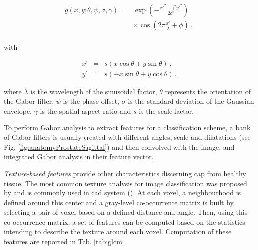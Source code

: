 \begin{enumerate}[leftmargin=*]
\begin{equation}
\begin{aligned}
	g(x,y;\theta,\psi,\sigma,\gamma) = & \exp \left( - \frac{x'^{2}+ \gamma^{2}y'^{2}}{2 \sigma^{2}} \right) \\
	& \times \cos \left( 2 \pi \frac{x'}{\lambda} + \phi \right) \ , \\
\end{aligned}
\end{equation}

\noindent with 

\begin{eqnarray}
	x' & = & s\left( x \cos \theta + y \sin \theta \right) \ , \nonumber \\
	y' & = & s \left( - x \sin \theta + y \cos \theta \right) \ . \nonumber
\end{eqnarray}

\noindent where $\lambda$ is the wavelength of the sinusoidal factor, $\theta$ represents the orientation of the Gabor filter, $\psi$ is the phase offset, $\sigma$ is the standard deviation of the Gaussian envelope, $\gamma$ is the spatial aspect ratio and $s$ is the scale factor.

To perform Gabor analysis to extract features for a classification scheme, a bank of Gabor filters is usually created with different angles, scale and dilatations (see Fig. \ref{fig:anatomyProstateSagittal}) and then convolved with the image. \cite{Viswanath2008a,Viswanath2012} and \cite{Tiwari2012} integrated Gabor analysis in their feature vector.

\textit{Texture-based features} provide other characteristics discerning \ac{cap} from healthy tissue. The most common texture analysis for image classification was proposed by \cite{Haralick1973} and is commonly used in \ac{cad} system (\cite{Antic2013,Niaf2011,Niaf2012,Tiwari2009a,Tiwari2010,Tiwari2013,Viswanath2008,Viswanath2008a,Viswanath2011,Viswanath2012}). At each voxel, a neighbourhood is defined around this center and a gray-level co-occurrence matrix is built by selecting a pair of voxel based on a defined distance and angle. Then, using this co-occurrence matrix, a set of features can be computed based on the statistics intending to describe the texture around each voxel. Computation of these features are reported in Tab. \ref{tab:glcm}.


\end{enumerate}
